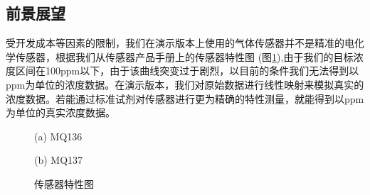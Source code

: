 \documentclass[UTF8]{ctexart}
\begin{document}
\subsection{前景展望}
受开发成本等因素的限制，我们在演示版本上使用的气体传感器并不是精准的电化学传感器，根据我们从传感器产品手册上的传感器特性图 (图\ref{PIC:MINI}),由于我们的目标浓度区间在100ppm以下，由于该曲线突变过于剧烈，以目前的条件我们无法得到以ppm为单位的浓度数据。在演示版本，我们对原始数据进行线性映射来模拟真实的浓度数据。若能通过标准试剂对传感器进行更为精确的特性测量，就能得到以ppm为单位的真实浓度数据。
\begin{figure}[H]
\centering
\begin{minipage}{0.4\linewidth}

    \noindent{}
	\centerline{(a) MQ136}
\end{minipage}
\hfill
\begin{minipage}{0.4\linewidth}

    \noindent{}
	\centerline{(b) MQ137}
\end{minipage}

\caption{传感器特性图}\label{PIC:MINI}

\end{figure}
\end{document}
